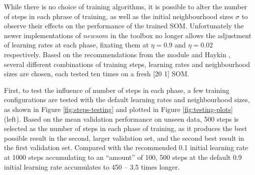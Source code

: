 \documentclass[10pt, oneside]{article}
\begin{document}
While there is no choice of training algorithms, it is possible to alter the number of steps in each phrase of training, as well as the initial neighbourhood sizes $\sigma$ to observe their effects on the performance of the trained SOM. Unfortunately the newer implementations of $newsom$ in the toolbox no longer allows the adjustment of learning rates at each phase, fixating them at $\eta=0.9$ and $\eta=0.02$ respectively\cite{newsom-matlab}. Based on the recommendations from the module \cite{som-lecture} and Haykin \cite{haykin2008}, several different combinations of training steps, learning rates and neighbourhood sizes are chosen, each tested ten times on a fresh [20 1] SOM. 

First, to test the influence of number of steps in each phase, a few training configurations are tested with the default learning rates and neighbourhood sizes, as shown in Figure \ref{fig:steps-testing} and plotted in Figure \ref{fig:testing-plots} (left). Based on the mean validation performance on unseen data, 500 steps is selected as the number of steps in each phase of training, as it produces the best possible result in the second, larger validation set, and the second best result in the first validation set. Compared with the recommended 0.1 initial learning rate at 1000 steps accumulating to an ``amount'' of 100, 500 steps at the default 0.9 initial learning rate accumulates to 450 -- 3.5 times longer.
\end{document}
